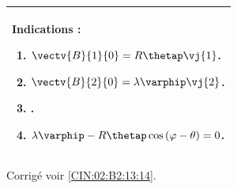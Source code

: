 \ifprof
\else
\footnotesize
\ifcolle
\else
\begin{marginfigure}
\begin{tabular}{|p{.9\linewidth}|}
\hline
Indications :
\begin{enumerate}
\item $\vectv{B}{1}{0}=R\thetap\vj{1}$.
\item $\vectv{B}{2}{0}=\lambda\varphip\vj{2}$.
\item .
\item $ \lambda\varphip - R\thetap \cos \left( \varphi - \theta\right)=0$.
\end{enumerate} \\ \hline
\end{tabular}
\end{marginfigure}
\fi
\normalsize

\begin{flushright}
\footnotesize{Corrigé  voir \ref{CIN:02:B2:13:14}.}
\end{flushright}%
\fi

